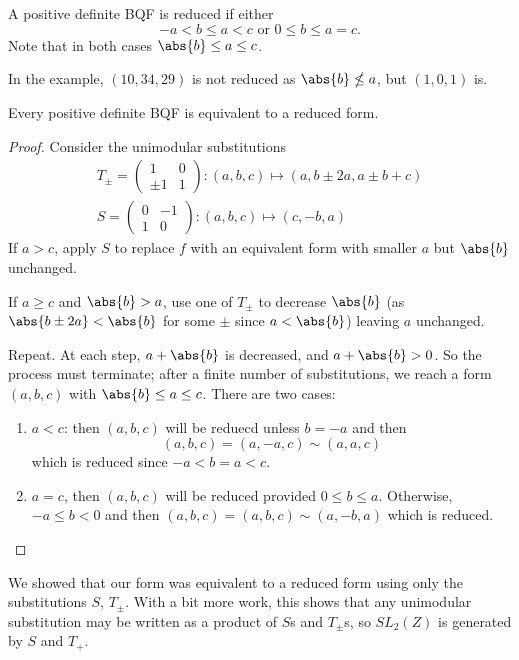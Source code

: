 \documentclass{article}
\begin{document}
\begin{defi}
    A positive definite BQF is reduced if either
    \begin{equation*}
        -a < b \leq a < c \text{ or } 0 \leq b \leq a = c.
    \end{equation*}
    Note that in both cases $\abs{b} \leq a \leq c$.

    In the example, $(10, 34, 29)$ is not reduced as $\abs{b} \nleq a$, but $(1, 0, 1)$ is.
\end{defi}

\begin{nlemma}\label{lem:4.5}
    Every positive definite BQF is equivalent to a reduced form.
\end{nlemma}

\begin{proof}Consider the unimodular substitutions
    \begin{align*}
        T_\pm =
        \begin{pmatrix} 1 & 0 \\ \pm 1 & 1 \end{pmatrix} : (a, b, c) \mapsto (a, b \pm 2a, a \pm b + c) \\
        S =
        \begin{pmatrix} 0 & -1 \\ 1 & 0 \end{pmatrix} : (a, b, c) \mapsto (c, -b, a)
    \end{align*}
    If $a > c$, apply $S$ to replace $f$ with an equivalent form with smaller $a$ but $\abs{b}$ unchanged.

    If $a \geq c$ and $\abs{b} > a$, use one of $T_\pm$ to decrease $\abs{b}$ (as $\abs{b \pm 2a} < \abs{b}$ for some $\pm$ since $a < \abs{b}$) leaving $a$ unchanged.

    Repeat. At each step, $a + \abs{b}$ is decreased, and $a + \abs{b} > 0$.
    So the process must terminate; after a finite number of substitutions, we reach a form $(a, b, c)$ with $\abs{b} \leq a \leq c$.
    There are two cases:
    \begin{enumerate}[label=\alph*)]
        \item $a < c$: then $(a, b, c)$ will be reduecd unless $b = -a$ and then
            \begin{equation*}
                (a, b, c) = (a, -a, c) \sim (a, a, c)
            \end{equation*}
            which is reduced since $-a < b = a < c$.
        \item $a = c$, then $(a, b, c)$ will be reduced provided $0 \leq b \leq a$. Otherwise, $-a \leq b < 0$ and then $(a, b, c) = (a, b, c) \sim (a, -b, a)$ which is reduced. \qedhere
    \end{enumerate}
\end{proof}

\begin{remark}
    We showed that our form was equivalent to a reduced form using only the substitutions $S$, $T_\pm$.
    With a bit more work, this shows that any unimodular substitution may be written as a product of $S$s and $T_\pm$s, so $SL_2(Z)$ is generated by $S$ and $T_+$.
\end{remark}
\end{document}
